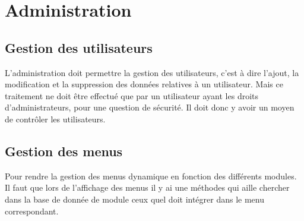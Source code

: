 \section{Administration}

\subsection{Gestion des utilisateurs}

L'administration doit permettre la gestion des utilisateurs, c'est à dire l'ajout, la modification et la suppression des données relatives à un utilisateur. Mais ce traitement ne doit être effectué que par un utilisateur ayant les droits d'administrateurs, pour une question de sécurité. Il doit donc y avoir un moyen de contrôler les utilisateurs.

\subsection{Gestion des menus}
Pour rendre la gestion des menus dynamique en fonction des différents modules. Il faut que lors de l'affichage des menus il y ai une méthodes qui aille chercher dans la base de donnée de module ceux quel doit intégrer dans le menu correspondant.

